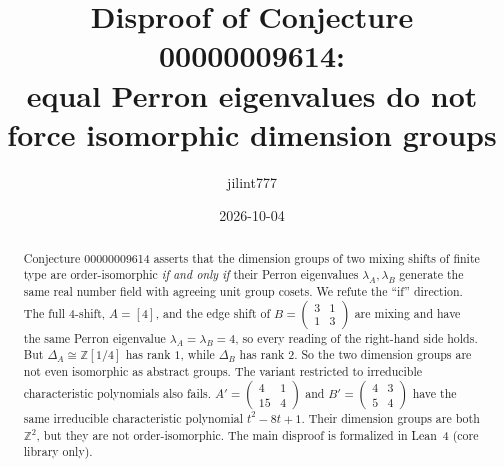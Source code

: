 \documentclass[11pt]{article}
\title{Disproof of Conjecture 00000009614:\\
equal Perron eigenvalues do not force isomorphic dimension groups}
\author{jilint777}
\date{2026-10-04}
\theoremstyle{definition}
\theoremstyle{remark}
\newcommand{\Z}{\mathbb{Z}}
\begin{document}
\sloppy
\maketitle

\begin{abstract}
Conjecture 00000009614 asserts that the dimension groups of two mixing shifts of
finite type are order-isomorphic \emph{if and only if} their Perron eigenvalues
$\lambda_A,\lambda_B$ generate the same real number field with agreeing unit group
cosets. We refute the ``if'' direction. The full $4$-shift, $A=[4]$, and the edge
shift of $B=\left(\begin{smallmatrix}3&1\\1&3\end{smallmatrix}\right)$ are mixing
and have the same Perron eigenvalue $\lambda_A=\lambda_B=4$, so every reading of
the right-hand side holds. But $\Delta_A\cong\Z[1/4]$ has rank $1$, while
$\Delta_B$ has rank $2$. So the two dimension groups are not even isomorphic as
abstract groups. The variant restricted to irreducible characteristic polynomials
also fails. $A'=\left(\begin{smallmatrix}4&1\\15&4\end{smallmatrix}\right)$ and
$B'=\left(\begin{smallmatrix}4&3\\5&4\end{smallmatrix}\right)$ have the same
irreducible characteristic polynomial $t^2-8t+1$. Their dimension groups are both
$\Z^2$, but they are not order-isomorphic. The main disproof is formalized in Lean~4
(core library only).
\end{abstract}
\end{document}
